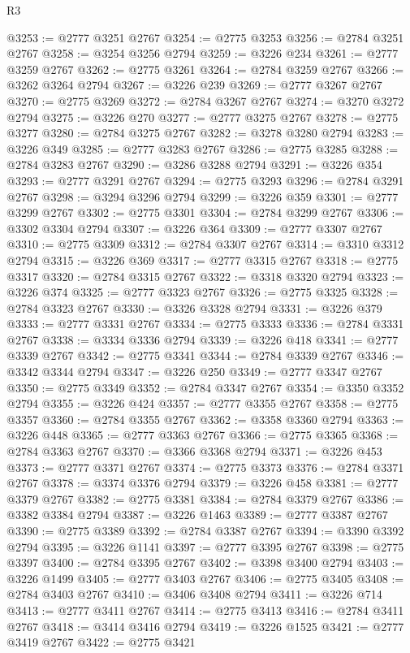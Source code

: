 \begin{lexlean}{R3}
\begin{coremodule}
@3253 := @2777 @3251 @2767
@3254 := @2775 @3253
@3256 := @2784 @3251 @2767
@3258 := @3254 @3256 @2794
@3259 := @3226 @234
@3261 := @2777 @3259 @2767
@3262 := @2775 @3261
@3264 := @2784 @3259 @2767
@3266 := @3262 @3264 @2794
@3267 := @3226 @239
@3269 := @2777 @3267 @2767
@3270 := @2775 @3269
@3272 := @2784 @3267 @2767
@3274 := @3270 @3272 @2794
@3275 := @3226 @270
@3277 := @2777 @3275 @2767
@3278 := @2775 @3277
@3280 := @2784 @3275 @2767
@3282 := @3278 @3280 @2794
@3283 := @3226 @349
@3285 := @2777 @3283 @2767
@3286 := @2775 @3285
@3288 := @2784 @3283 @2767
@3290 := @3286 @3288 @2794
@3291 := @3226 @354
@3293 := @2777 @3291 @2767
@3294 := @2775 @3293
@3296 := @2784 @3291 @2767
@3298 := @3294 @3296 @2794
@3299 := @3226 @359
@3301 := @2777 @3299 @2767
@3302 := @2775 @3301
@3304 := @2784 @3299 @2767
@3306 := @3302 @3304 @2794
@3307 := @3226 @364
@3309 := @2777 @3307 @2767
@3310 := @2775 @3309
@3312 := @2784 @3307 @2767
@3314 := @3310 @3312 @2794
@3315 := @3226 @369
@3317 := @2777 @3315 @2767
@3318 := @2775 @3317
@3320 := @2784 @3315 @2767
@3322 := @3318 @3320 @2794
@3323 := @3226 @374
@3325 := @2777 @3323 @2767
@3326 := @2775 @3325
@3328 := @2784 @3323 @2767
@3330 := @3326 @3328 @2794
@3331 := @3226 @379
@3333 := @2777 @3331 @2767
@3334 := @2775 @3333
@3336 := @2784 @3331 @2767
@3338 := @3334 @3336 @2794
@3339 := @3226 @418
@3341 := @2777 @3339 @2767
@3342 := @2775 @3341
@3344 := @2784 @3339 @2767
@3346 := @3342 @3344 @2794
@3347 := @3226 @250
@3349 := @2777 @3347 @2767
@3350 := @2775 @3349
@3352 := @2784 @3347 @2767
@3354 := @3350 @3352 @2794
@3355 := @3226 @424
@3357 := @2777 @3355 @2767
@3358 := @2775 @3357
@3360 := @2784 @3355 @2767
@3362 := @3358 @3360 @2794
@3363 := @3226 @448
@3365 := @2777 @3363 @2767
@3366 := @2775 @3365
@3368 := @2784 @3363 @2767
@3370 := @3366 @3368 @2794
@3371 := @3226 @453
@3373 := @2777 @3371 @2767
@3374 := @2775 @3373
@3376 := @2784 @3371 @2767
@3378 := @3374 @3376 @2794
@3379 := @3226 @458
@3381 := @2777 @3379 @2767
@3382 := @2775 @3381
@3384 := @2784 @3379 @2767
@3386 := @3382 @3384 @2794
@3387 := @3226 @1463
@3389 := @2777 @3387 @2767
@3390 := @2775 @3389
@3392 := @2784 @3387 @2767
@3394 := @3390 @3392 @2794
@3395 := @3226 @1141
@3397 := @2777 @3395 @2767
@3398 := @2775 @3397
@3400 := @2784 @3395 @2767
@3402 := @3398 @3400 @2794
@3403 := @3226 @1499
@3405 := @2777 @3403 @2767
@3406 := @2775 @3405
@3408 := @2784 @3403 @2767
@3410 := @3406 @3408 @2794
@3411 := @3226 @714
@3413 := @2777 @3411 @2767
@3414 := @2775 @3413
@3416 := @2784 @3411 @2767
@3418 := @3414 @3416 @2794
@3419 := @3226 @1525
@3421 := @2777 @3419 @2767
@3422 := @2775 @3421

\end{coremodule}
\end{lexlean}
